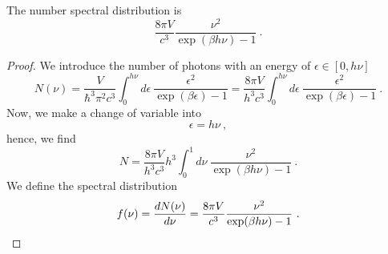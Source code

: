     The number spectral distribution is 
    \begin{equation}
        \frac{8 \pi V}{c^3} \frac{\nu^2}{\exp(\beta h \nu) - 1} ~.
    \end{equation}
    \begin{proof}
        We introduce the number of photons with an energy of $\epsilon \in [0, h\nu]$
        \begin{equation}
            N(\nu) = \frac{V}{\hbar^3 \pi^2 c^3} \int_0^{h\nu} d\epsilon ~ \frac{\epsilon^2}{\exp(\beta \epsilon) - 1} = \frac{8 \pi V}{h^3 c^3} \int_0^{h\nu} d\epsilon ~ \frac{\epsilon^2}{\exp(\beta \epsilon) - 1} ~.
        \end{equation}
        Now, we make a change of variable into 
        \begin{equation}
            \epsilon = h \nu ~,
        \end{equation}
        hence, we find 
        \begin{equation*}
            N = \frac{8 \pi V}{h^3 c^3} h^3 \int_0^{1} d\nu ~ \frac{\nu^2}{\exp(\beta h \nu) - 1} ~.
        \end{equation*}
        We define the spectral distribution 
        \begin{equation}
            f(\nu) = \frac{dN(\nu)}{d\nu} = \frac{8 \pi V}{c^3} \frac{\nu^2}{\exp(\beta h \nu) - 1} ~.
        \end{equation}
    \end{proof}

